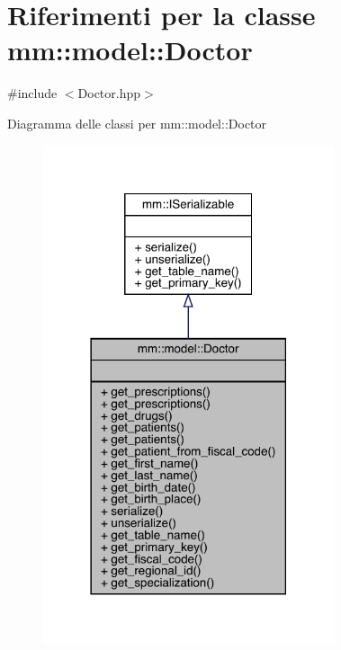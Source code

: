 \hypertarget{classmm_1_1model_1_1_doctor}{}\section{Riferimenti per la classe mm\+:\+:model\+:\+:Doctor}
\label{classmm_1_1model_1_1_doctor}


{\ttfamily \#include $<$Doctor.\+hpp$>$}



Diagramma delle classi per mm\+:\+:model\+:\+:Doctor
\nopagebreak
\begin{figure}[H]
\begin{center}
\leavevmode
\includegraphics[width=242pt]{dd/d55/classmm_1_1model_1_1_doctor__inherit__graph}
\end{center}
\end{figure}


